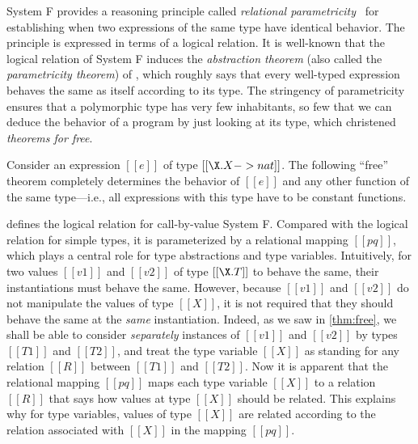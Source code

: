 System F provides a reasoning principle called \textit{relational
  parametricity}~\citep{reynolds1983types} for establishing when two expressions
of the same type have identical behavior. The principle is expressed in terms of
a logical relation. It is well-known that the logical relation of System F
induces the \textit{abstraction theorem} (also called the \textit{parametricity
  theorem}) of \citet{reynolds1983types}, which roughly says that every
well-typed expression behaves the same as itself according to its type. The
stringency of parametricity ensures that a polymorphic type has very few
inhabitants, so few that we can deduce the behavior of a program by just looking
at its type, which \citet{wadler1989theorems} christened \textit{theorems for free}.

Consider an expression $[[e]]$ of type $[[ \X . X -> nat ]]$. The following
``free'' theorem completely determines the behavior of $[[e]]$ and any other
function of the same type---i.e., all expressions with this type have to be constant
functions.



 defines the logical relation for call-by-value System F.
Compared with the logical relation for simple types, it is parameterized by a
relational mapping $[[pq]]$, which plays a central role for type abstractions
and type variables. Intuitively, for two values $[[v1]]$ and $[[v2]]$ of type
$[[\X . T]]$ to behave the same, their instantiations must behave the same.
However, because $[[v1]]$ and $[[v2]]$ do not manipulate the values of type
$[[X]]$, it is not required that they should behave the same at the
\textit{same} instantiation. Indeed, as we saw in \cref{thm:free}, we shall be
able to consider \textit{separately} instances of $[[v1]]$ and $[[v2]]$ by types
$[[T1]]$ and $[[T2]]$, and treat the type variable $[[X]]$ as standing for any
relation $[[R]]$ between $[[T1]]$ and $[[T2]]$. Now it is apparent that the
relational mapping $[[pq]]$ maps each type variable $[[X]]$ to a relation
$[[R]]$ that says how values at type $[[X]]$ should be related. This explains
why for type variables, values of type $[[X]]$ are related according to the
relation associated with $[[X]]$ in the mapping $[[pq]]$.



